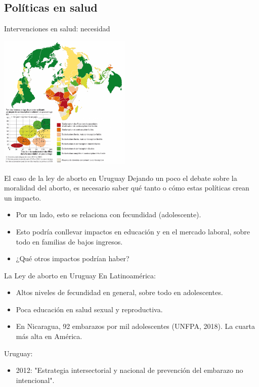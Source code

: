\documentclass[11pt, aspectratio=169, compress]{beamer}
\begin{document}
\subsection{Políticas en salud}
\begin{frame}[t]{Intervenciones en salud: necesidad}
\begin{center}
	\includegraphics[width=0.475\textwidth]{fig1.png}	
\end{center}
\end{frame}
\begin{frame}[t]{El caso de la ley de aborto en Uruguay}
Dejando un poco el debate sobre la moralidad del aborto, es necesario saber qué tanto o cómo estas políticas crean un impacto.  
\begin{itemize}
	\item Por un lado, esto se relaciona con fecundidad (adolescente). 
	\item Esto podría conllevar impactos en educación y en el mercado laboral, sobre todo en familias de bajos ingresos. 
	\item ¿Qué otros impactos podrían haber? 
\end{itemize}
\end{frame}
\begin{frame}[t]{La Ley de aborto en Uruguay} 
En Latinoamérica: 
\begin{itemize}
	\item Altos niveles de fecundidad en general, sobre todo en adolescentes. 
	\item Poca educación en salud sexual y reproductiva. 
	\item En Nicaragua, 92 embarazos por mil adolescentes (UNFPA, 2018). La cuarta más alta en América. 
\end{itemize}
Uruguay: 
\begin{itemize}
	\item 2012: "Estrategia intersectorial y nacional de prevención del embarazo no intencional". 
\end{itemize}
\end{frame}
\end{document}
